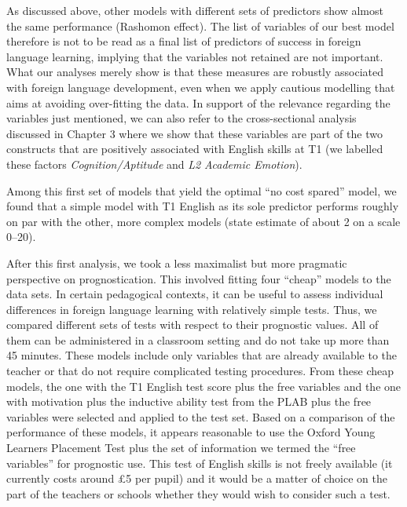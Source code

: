 \documentclass[output=paper]{langsci/langscibook}
\begin{document}
As discussed above, other models with different sets of predictors show almost the same performance (Rashomon effect). The list of variables of our best model therefore is not to be read as a final list of predictors of success in foreign language learning, implying that the variables not retained are not important. What our analyses merely show is that these measures are robustly associated with foreign language development, even when we apply cautious modelling that aims at avoiding over-fitting the data. In support of the relevance regarding the variables just mentioned, we can also refer to the cross-sectional analysis discussed in Chapter 3 where we show that these variables are part of the two constructs that are positively associated with English skills at T1 (we labelled these factors \textit{Cognition/Aptitude} and \textit{L2} \textit{Academic Emotion}).

Among this first set of models that yield the optimal ``no cost spared'' model, we found that a simple model with T1 English as its sole predictor performs roughly on par with the other, more complex models (state estimate of about 2 on a scale 0--20). 

After this first analysis, we took a less maximalist but more pragmatic perspective on prognostication. This involved fitting four ``cheap'' models to the data sets. In certain pedagogical contexts, it can be useful to assess individual differences in foreign language learning with relatively simple tests. Thus, we compared different sets of tests with respect to their prognostic values. All of them can be administered in a classroom setting and do not take up more than 45 minutes. These models include only variables that are already available to the teacher or that do not require complicated testing procedures. From these cheap models, the one with the T1 English test score plus the free variables and the one with motivation plus the inductive ability test from the PLAB plus the free variables were selected and applied to the test set. Based on a comparison of the performance of these models, it appears reasonable to use the Oxford Young Learners Placement Test plus the set of information we termed the ``free variables'' for prognostic use. This test of English skills is not freely available (it currently costs around £5 per pupil) and it would be a matter of choice on the part of the teachers or schools whether they would wish to consider such a test. 
\end{document}
